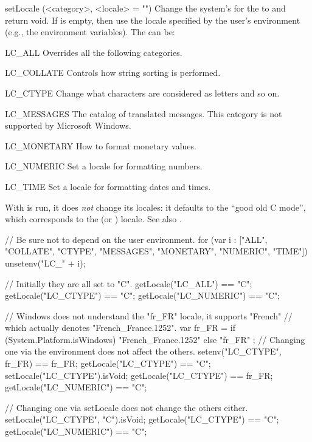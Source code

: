 \begin{urbiscriptapi}
\item[setLocale](<category>, <locale> = "")%
  Change the system's  for the  to 
  and return void.  If  is empty, then use the locale specified
  by the user's environment (e.g., the environment variables).  The
   can be:
  \begin{sublist}
    \begin{envs}
    \item[LC\_ALL] Overrides all the following categories.
    \item[LC\_COLLATE] Controls how string sorting is performed.
    \item[LC\_CTYPE] Change what characters are considered as letters and so
      on.
    \item[LC\_MESSAGES] The catalog of translated messages.  This category
      is not supported by Microsoft Windows.
    \item[LC\_MONETARY] How to format monetary values.
    \item[LC\_NUMERIC] Set a locale for formatting numbers.
    \item[LC\_TIME] Set a locale for formatting dates and times.
    \end{envs}
  \end{sublist}
  With  is run, it does \emph{not} change its locales: it
  defaults to the ``good old C mode'', which corresponds to the  (or
  ) locale.  See also .
\begin{urbicomment}
// Be sure not to depend on the user environment.
for (var i : ["ALL", "COLLATE", "CTYPE", "MESSAGES", "MONETARY",
              "NUMERIC", "TIME"])
  unsetenv("LC_" + i);
\end{urbicomment}
\begin{urbiassert}
// Initially they are all set to "C".
getLocale("LC_ALL")     == "C";
getLocale("LC_CTYPE")   == "C";
getLocale("LC_NUMERIC") == "C";

// Windows does not understand the "fr_FR" locale, it supports "French"
// which actually denotes "French_France.1252".
var fr_FR =
  { if (System.Platform.isWindows) "French_France.1252" else "fr_FR" };
// Changing one via the environment does not affect the others.
setenv("LC_CTYPE", fr_FR) == fr_FR;
getLocale("LC_CTYPE")   == "C";
setLocale("LC_CTYPE").isVoid;
getLocale("LC_CTYPE")   == fr_FR;
getLocale("LC_NUMERIC") == "C";

// Changing one via setLocale does not change the others either.
setLocale("LC_CTYPE", "C").isVoid;
getLocale("LC_CTYPE")   == "C";
getLocale("LC_NUMERIC") == "C";


\end{urbiassert}
\end{urbiscriptapi}
